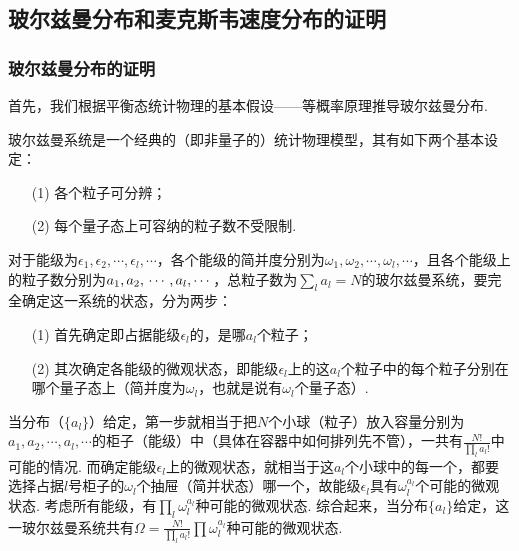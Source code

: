 \documentclass{assignment}
\begin{document}
\subsection{玻尔兹曼分布和麦克斯韦速度分布的证明}

\subsubsection{玻尔兹曼分布的证明}
首先，我们根据平衡态统计物理的基本假设——等概率原理推导玻尔兹曼分布.

玻尔兹曼系统是一个经典的（即非量子的）统计物理模型，其有如下两个基本设定：
\begin{itemize}
    \item[(1)] 各个粒子可分辨；
    \item[(2)] 每个量子态上可容纳的粒子数不受限制.
\end{itemize}

对于能级为$\epsilon_1,\epsilon_2,\cdots,\epsilon_l,\cdots$，各个能级的简并度分别为$\omega_1,\omega_2,\cdots,\omega_l,\cdots$，且各个能级上的粒子数分别为$a_1,a_2,\\\cdots,a_l,\cdots$，总粒子数为$\sum_la_l=N$的玻尔兹曼系统，要完全确定这一系统的状态，分为两步：
\begin{itemize}
    \item[(1)] 首先确定即占据能级$\epsilon_l$的，是哪$a_l$个粒子；
    \item[(2)] 其次确定各能级的微观状态，即能级$\epsilon_l$上的这$a_l$个粒子中的每个粒子分别在哪个量子态上（简并度为$\omega_l$，也就是说有$\omega_l$个量子态）.
\end{itemize}
当分布（$\{a_l\}$）给定，第一步就相当于把$N$个小球（粒子）放入容量分别为$a_1,a_2,\cdots,a_l,\cdots$的柜子（能级）中（具体在容器中如何排列先不管），一共有$\frac{N!}{\prod_la_l!}$中可能的情况. 而确定能级$\epsilon_l$上的微观状态，就相当于这$a_l$个小球中的每一个，都要选择占据$l$号柜子的$\omega_l$个抽屉（简并状态）哪一个，故能级$\epsilon_l$具有$\omega_l^{a_l}$个可能的微观状态. 考虑所有能级，有$\prod_l\omega_l^{a_l}$种可能的微观状态. 综合起来，当分布$\{a_l\}$给定，这一玻尔兹曼系统共有$\Omega=\frac{N!}{\prod_la_l!}\prod\omega_l^{a_l}$种可能的微观状态.
\end{document}
